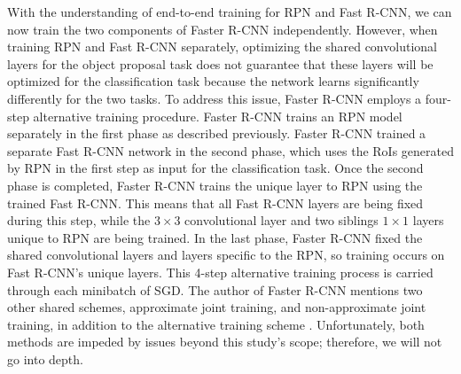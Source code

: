 With the understanding of end-to-end training for RPN and Fast R-CNN, we can now train the two components of Faster R-CNN independently. However, when training RPN and Fast R-CNN separately, optimizing the shared convolutional layers for the object proposal task does not guarantee that these layers will be optimized for the classification task because the network learns significantly differently for the two tasks. To address this issue, Faster R-CNN employs a four-step alternative training procedure. Faster R-CNN trains an RPN model separately in the first phase as described previously. Faster R-CNN trained a separate Fast R-CNN network in the second phase, which uses the RoIs generated by RPN in the first step as input for the classification task. Once the second phase is completed, Faster R-CNN trains the unique layer to RPN using the trained Fast R-CNN. This means that all Fast R-CNN layers are being fixed during this step, while the $3 \times 3$ convolutional layer and two siblings $1 \times 1$ layers unique to RPN are being trained. In the last phase, Faster R-CNN fixed the shared convolutional layers and layers specific to the RPN, so training occurs on Fast R-CNN's unique layers. This 4-step alternative training process is carried through each minibatch of SGD. The author of Faster R-CNN mentions two other shared schemes, approximate joint training, and non-approximate joint training, in addition to the alternative training scheme \cite{faster_rcnn_2015}. Unfortunately, both methods are impeded by issues beyond this study's scope; therefore, we will not go into depth.
